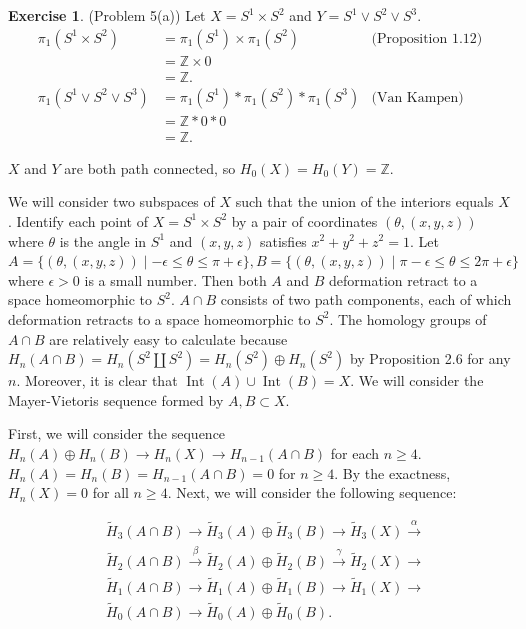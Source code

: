\documentclass[12pt, psamsfonts]{amsart}
\theoremstyle{definition}
\newtheorem*{exer}{Exercise}
\theoremstyle{remark}
\DeclareMathOperator{\Int}{Int}
\numberwithin{equation}{section}
\begin{document}
\begin{exer}{(Problem 5(a))}
  Let $X = S^1 \times S^2$ and $Y = S^1 \vee S^2 \vee S^3$.
  \begin{align*}
    \pi_1(S^1 \times S^2)
      &= \pi_1(S^1) \times \pi_1(S^2) & \text{(Proposition 1.12)} \\
      &= \mathbb{Z} \times 0 \\
      &= \mathbb{Z}. \\
    \pi_1(S^1 \vee S^2 \vee S^3)
      &= \pi_1(S^1) * \pi_1(S^2) * \pi_1(S^3) & \text{(Van Kampen)} \\
      &= \mathbb{Z} * 0 * 0 \\
      &= \mathbb{Z}.
  \end{align*}

  $X$ and $Y$ are both path connected, so $H_0(X) = H_0(Y) = \mathbb{Z}$.

  We will consider two subspaces of $X$ such that the union of the interiors equals $X$.
  Identify each point of $X = S^1 \times S^2$ by a pair of coordinates $(\theta, (x, y, z))$ where $\theta$ is the angle in $S^1$ and $(x, y, z)$ satisfies $x^2 + y^2 + z^2 = 1$.
  Let $A = \{ (\theta, (x, y, z)) \mid -\epsilon \leq \theta \leq \pi + \epsilon \}, B = \{ (\theta, (x, y, z)) \mid \pi - \epsilon \leq \theta \leq 2\pi + \epsilon \}$ where $\epsilon > 0$ is a small number.
  Then both $A$ and $B$ deformation retract to a space homeomorphic to $S^2$.
  $A \cap B$ consists of two path components, each of which deformation retracts to a space homeomorphic to $S^2$.
  The homology groups of $A \cap B$ are relatively easy to calculate because $H_n(A \cap B) = H_n(S^2 \coprod S^2) = H_n(S^2) \oplus H_n(S^2)$ by Proposition 2.6 for any $n$.
  Moreover, it is clear that $\Int(A) \cup \Int(B) = X$.
  We will consider the Mayer-Vietoris sequence formed by $A, B \subset X$.

  First, we will consider the sequence $H_n(A) \oplus H_n(B) \rightarrow H_n(X) \rightarrow H_{n - 1}(A \cap B)$ for each $n \geq 4$.
  $H_n(A) = H_n(B) = H_{n - 1}(A \cap B) = 0$ for $n \geq 4$.
  By the exactness, $H_n(X) = 0$ for all $n \geq 4$.
  Next, we will consider the following sequence:

  \begin{align*}
    &\tilde{H}_3(A \cap B) \rightarrow \tilde{H}_3(A) \oplus \tilde{H}_3(B) \rightarrow \tilde{H}_3(X) \xrightarrow{\alpha} \\
    &\tilde{H}_2(A \cap B) \xrightarrow{\beta} \tilde{H}_2(A) \oplus \tilde{H}_2(B) \xrightarrow{\gamma} \tilde{H}_2(X) \rightarrow \\
    &\tilde{H}_1(A \cap B) \rightarrow \tilde{H}_1(A) \oplus \tilde{H}_1(B) \rightarrow \tilde{H}_1(X) \rightarrow \\
    &\tilde{H}_0(A \cap B) \rightarrow \tilde{H}_0(A) \oplus \tilde{H}_0(B).
  \end{align*}


\end{exer}
\end{document}
